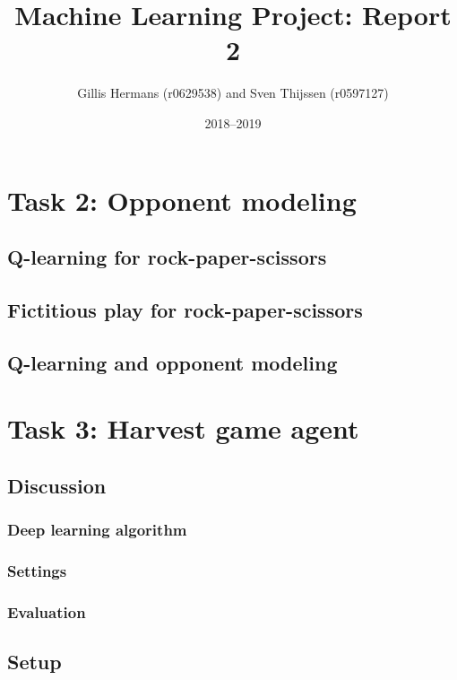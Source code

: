 \documentclass[a4paper]{article}
\title{Machine Learning Project: Report 2}
\author{Gillis Hermans (r0629538) and Sven Thijssen (r0597127)}
\date{2018--2019}
\begin{document}
\maketitle

\section{Task 2: Opponent modeling}
\subsection{Q-learning for rock-paper-scissors}

\subsection{Fictitious play for rock-paper-scissors}

\subsection{Q-learning and opponent modeling}

\newpage

\section{Task 3: Harvest game agent}
\subsection{Discussion}
\subsubsection{Deep learning algorithm}
\subsubsection{Settings}
\subsubsection{Evaluation}

\subsection{Setup}
\end{document}
